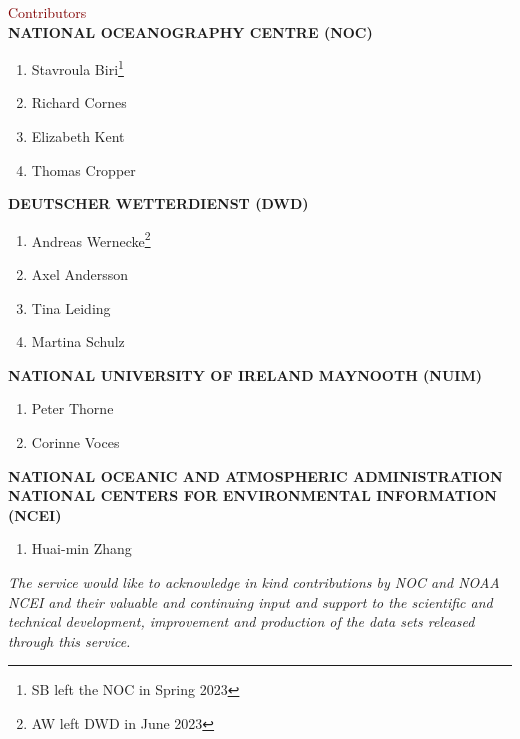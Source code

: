 \newpage

\begin{adjustwidth}{2.cm}{}
\vspace* {10mm}

{\fontsize{20}{24} \selectfont \textcolor{maroon}{Contributors}}\\

{\fontsize{14}{17} \selectfont \textbf{\uppercase{{National Oceanography Centre (NOC)}}}}
\begin{enumerate}
\item Stavroula Biri\footnote{SB left the NOC in Spring 2023}
\item Richard Cornes
\item Elizabeth Kent
\item Thomas Cropper
\end{enumerate}

{\fontsize{14}{17} \selectfont \textbf{\uppercase{Deutscher Wetterdienst (DWD)}}}
\begin{enumerate}
\item Andreas Wernecke\footnote{AW left DWD in June 2023}
\item Axel Andersson
\item Tina Leiding
\item Martina Schulz
\end{enumerate}

{\fontsize{14}{17} \selectfont \textbf{\uppercase{National University of Ireland Maynooth (NUIM)}}}
\begin{enumerate}
\item Peter Thorne
\item Corinne Voces
\end{enumerate}

{\fontsize{14}{17} \selectfont \textbf{\uppercase{National Oceanic and Atmospheric Administration National Centers for Environmental Information (NCEI)}}}
\begin{enumerate}
\item Huai-min Zhang
\end{enumerate}

\vspace* {20mm}

\textit{The service would like to acknowledge in kind contributions by NOC and NOAA NCEI and their valuable and continuing input and support to the scientific and technical development, improvement and production of the data sets released through this service.}

\end{adjustwidth}
